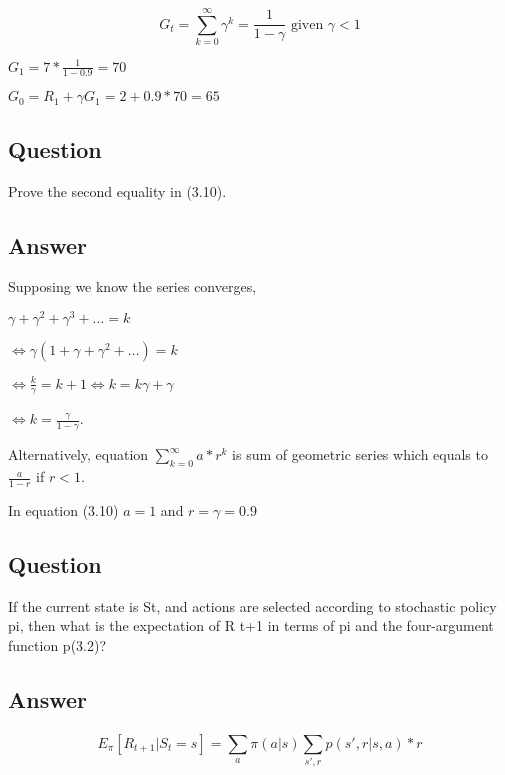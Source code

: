 \documentclass[11pt]{article}
\begin{document}
    \begin{equation}
        G_t = \sum_{k=0}^{\infty} \gamma ^ k = \frac{1}{1-\gamma} \text{ given } \gamma < 1
    \end{equation}

    $G_1 = 7 * \frac{1}{1-0.9} = 70 $

    $G_0 = R_{1} + \gamma G_{1} = 2 + 0.9 * 70 = 65 $

    \subsection{Question}

    Prove the second equality in (3.10).

    \subsection*{Answer}

Supposing we know the series converges,

$\gamma + \gamma^2 + \gamma^3 + \dots = k$

$\Leftrightarrow \gamma(1+\gamma + \gamma^2 + \dots) = k$ 

$\Leftrightarrow \frac{k}{\gamma} = k + 1 \Leftrightarrow k = k\gamma + \gamma$

$\Leftrightarrow k = \frac{\gamma}{1-\gamma}$.

Alternatively, equation $\sum_{k=0}^{\infty}a*r^k$ is sum of geometric series which equals to $\frac{a}{1-r}$ if $r<1$.

In equation (3.10) $a=1$ and $r = \gamma = 0.9$

    \subsection{Question}

    If the current state is St, and actions are selected according to stochastic policy pi, then what is the expectation of R t+1 in terms of pi and the four-argument function p(3.2)?

    \subsection*{Answer}

    \begin{equation}
        E_{\pi}[R_{t+1}|S_{t}=s] = \sum_{a}^{} \pi(a|s) \sum_{s', r}^{} p(s',r|s, a) * r
    \end{equation}
\end{document}
